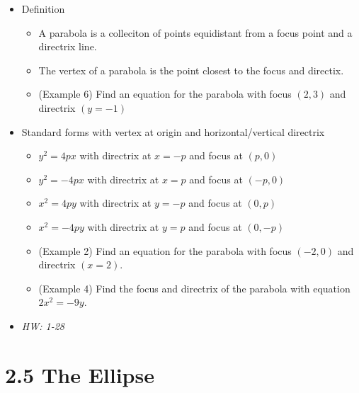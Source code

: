 \documentclass[11pt]{article}
\begin{document}
\begin{itemize}
  \item Definition
    \begin{itemize}
      \item A parabola is a colleciton of points equidistant from a focus point
        and a directrix line.
      \item The vertex of a parabola is the point closest to the focus and
        directix.
      \item (Example 6) Find an equation for the parabola with focus \((2,3)\)
        and directrix \((y=-1)\)
    \end{itemize}
  \item Standard forms with vertex at origin and horizontal/vertical directrix
    \begin{itemize}
      \item \(y^2=4px\) with directrix at \(x=-p\) and focus at \((p,0)\)
      \item \(y^2=-4px\) with directrix at \(x=p\) and focus at \((-p,0)\)
      \item \(x^2=4py\) with directrix at \(y=-p\) and focus at \((0,p)\)
      \item \(x^2=-4py\) with directrix at \(y=p\) and focus at \((0,-p)\)
      \item (Example 2) Find an equation for the parabola with focus
            \((-2,0)\) and directrix \((x=2)\).
      \item (Example 4) Find the focus and directrix of the parabola with
            equation \(2x^2=-9y\).
    \end{itemize}
  \item\textit{
    HW: 1-28
  }
\end{itemize}

\section*{2.5 The Ellipse}
\end{document}
